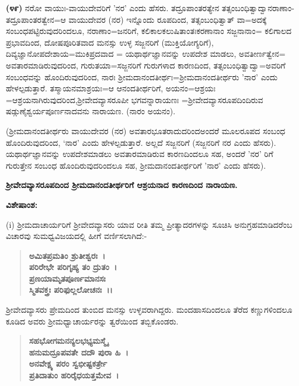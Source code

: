 \textbf{(೪೯)} ನರೋ ವಾಯುಃ-ವಾಯುದೇವರಿಗೆ 'ನರ' ಎಂದು ಹೆಸರು. ತದ್ರೂಪಾಂತರತ್ಯೇನ ತತ್ಸಂಬಂಧಿತ್ವಾದ್ವಾನರಾಣಾಂ-ತದ್ರೂಪಾಂತರತ್ವೇನ=ಆ ವಾಯುದೇವರ (ನರ) ಇನ್ನೊಂದು ರೂಪದಿಂದ, ತತ್ಸಂಬಂಧಿತ್ವಾತ್ ವಾ=ಅದಕ್ಕೆ ಸಂಬಂಧಪಟ್ಟಿರುವುದರಿಂದಲೂ, ನರಾಣಾಂ=\break ಜನರಿಗೆ, ಕಲಿಕಾಲಕಲುಷಿತಾಂತಃಕರಣಾನಾಂ ಸಜ್ಜನಾನಾಂ= ಕಲಿಗಾಲದ ಪ್ರಭಾವದಿಂದ, ದೋಷಪೂರಿತವಾದ ಮನಸ್ಸು ಉಳ್ಳ ಸಜ್ಜನರಿಗೆ (ಮುಕ್ತಿಯೋಗ್ಯರಿಗೆ), ದಿವ್ಯಜ್ಞಾನೋಪದೇಶಾಯ=ಮುಕಿಪ್ರದವಾದ = ಯಥಾರ್ಥಜ್ಞಾನವನ್ನು ಉಪದೇಶ ಮಾಡಲು, ಅವತೀರ್ಣತ್ವೇನ= ಅವತಾರಮಾಡಿರುವುದರಿಂದ, ಗುರುತಯಾ=ಸಜ್ಜನರಿಗೆ ಗುರುಗಳಾದ ಕಾರಣದಿಂದ, ತತ್ಸಂಬಂಧಿತ್ವಾದ್ವಾ=ಅವರಿಗೆ ಸಂಬಂಧವನ್ನು ಹೊಂದಿರುವುದರಿಂದ, ನಾರಃ ಶ‍್ರೀಮದಾನಂದ\-ತೀರ್ಥಃ=ಶ‍್ರೀಮದಾನಂದತೀರ್ಥರು 'ನಾರ' ಎಂದು ಹೇಳಲ್ಪಡುತ್ತಾರೆ. ತಸ್ಮಾಯನಮಾ\-ಶ್ರಯಃ=ಆ ಆನಂದತೀರ್ಥರಿಗೆ, ಅಯನಂ=ಆಶ್ರಯಃ =ಆಶ್ರಯನಾಗಿರುವುದರಿಂದ,\break ಶ‍್ರೀವೇದವ್ಯಾಸರೂಪೀ ಭಗವನ್ನಾರಾಯಣಃ =ಶ‍್ರೀವೇದವ್ಯಾಸರೂಪದಿಂದಿರುವ ಷಡ್ಗುಣೈ\-ಶ್ವರ್ಯಪೂರ್ಣನಾದವನು ನಾರಾಯಣ. (ನಾರಂ ಅಯನಂ).

(ಶ‍್ರೀಮದಾನಂದತೀರ್ಥರು ವಾಯುದೇವರ (ನರ) ಅವತಾರಭೂತರಾದುದರಿಂದ\break ಅಂದರೆ ಮೂಲರೂಪದ ಸಂಬಂಧ ಹೊಂದಿರುವುದರಿಂದ, `ನಾರ' ಎಂದು ಹೇಳಲ್ಪಡುತ್ತಾರೆ. ಅಲ್ಲದೆ ಸಜ್ಜನರಿಗೆ (ಸಜ್ಜನರಿಗೆ ನರ ಎಂದು ಹೆಸರು). ಯಥಾರ್ಥಜ್ಞಾನವನ್ನು ಉಪದೇಶಮಾಡಲು ಅವತಾರಮಾಡಿರುವ ಕಾರಣದಿಂದಲೂ ಸಹ, ಅಂದರೆ 'ನರ' ರಿಗೆ ಗುರುತ್ತೇನ ಸಂಬಂಧ ಹೊಂದಿರುವುದರಿಂದಲೂ ಸಹ, ಶ‍್ರೀಮದಾನಂದತೀರ್ಥರಿಗೆ 'ನಾರ' ಎಂದು ಹೆಸರು).

\begin{center}
\textbf{ಶ‍್ರೀವೇದವ್ಯಾಸರೂಪದಿಂದ ಶ‍್ರೀಮದಾನಂದತೀರ್ಥರಿಗೆ ಆಶ್ರಯನಾದ ಕಾರಣದಿಂದ ನಾರಾಯಣ.}
\end{center}

\noindent
\textbf{ವಿಶೇಷಾಂಶ:\enginline{-}}

(i) ಶ‍್ರೀಮದಾಚಾರ್ಯರಿಗೆ ಶ‍್ರೀವೇದವ್ಯಾಸರು ಯಾವ ರೀತಿ ತಮ್ಮ ಪ್ರೀತ್ಯಾದರಗಳನ್ನು ಸೂಚಿಸಿ ಅನುಗ್ರಹಮಾಡಿದರೆಂಬ ವಿಚಾರವು ಸುಮಧ್ವವಿಜಯದಲ್ಲಿ ಹೀಗೆ ವರ್ಣಿಸಲಾಗಿದೆ:-

\begin{verse}
\textbf{ಅಮಿತಪ್ರಮತಿಂ ಶ್ರುತೀಶ್ವರಃ~।}\\\textbf{ಪರಿರೇಭೇ ಪರಿಗೃಹ್ಯ ತಂ ದ್ರುತಂ~।}\\\textbf{ಪ್ರಣಯಾಮೃತಪೂರ್ಣಮಾನಸಃ}\\\textbf{ಸ್ಮಿತವಕ್ತ್ರಃ ಪರಿಫುಲ್ಲಲೋಚನಃ~।।}
\end{verse}

ಶ‍್ರೀವೇದವ್ಯಾಸರು ಪ್ರೇಮದಿಂದ ತುಂಬಿದ ಮನಸ್ಸು ಉಳ್ಳವರಾಗಿದ್ದರು. ಮಂದಹಾಸದಿಂದಲೂ ತೆರೆದ ಕಣ್ಣುಗಳಿಂದಲೂ ಕೂಡಿದ ಅವರು ಶ‍್ರೀಮಧ್ವಾಚಾರ್ಯರನ್ನು ತ್ವರೆಯಿಂದ ತಬ್ಬಿಕೊಂಡರು.

\begin{verse}
\textbf{ಸಹಭೋಗಮನನ್ಯಲಭಭ್ಯಮಸ್ಮೈ}\\\textbf{ಹನುಮದ್ರೂಪವತೇ ದದೌ ಪುರಾ ಹಿ~।}\\\textbf{ಅನವೇಕ್ಷ್ಯ ಪರಂ ಸ್ವಭೀಷ್ಟಕರ್ತ್ರೇ}\\\textbf{ಪ್ರತಿದಾತುಂ ಹರಿರೈಧಯತ್ತಮೇವ~।}
\end{verse}

